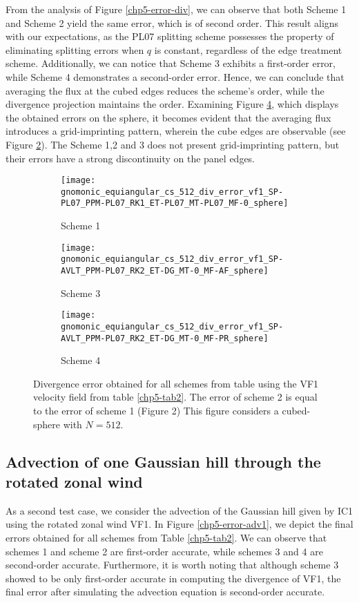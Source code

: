 From the analysis of Figure \ref{chp5-error-div}, we can observe that both Scheme 1 and Scheme 2 yield the same error,
which is of second order. This result aligns with our expectations, as the PL07 splitting scheme possesses the property of eliminating
splitting errors when $q$ is constant, regardless of the edge treatment scheme.
Additionally, we can notice that Scheme 3 exhibits a first-order error, while Scheme 4 demonstrates a second-order error.
Hence, we can conclude that averaging the flux at the cubed edges reduces the scheme's order, while the divergence projection maintains the order.
Examining Figure \ref{chp5-div}, which displays the obtained errors on the sphere, it becomes evident that the averaging
flux introduces a grid-imprinting pattern, wherein the cube edges are observable (see Figure \ref{chp5-div2}).
The Scheme 1,2 and 3 does not present grid-imprinting pattern, but their errors have a strong discontinuity on the panel edges.
\begin{figure}[!htb]
	\centering
	\begin{subfigure}{0.3\textwidth}
		\centering
		\texttt{[image: gnomonic\_equiangular\_cs\_512\_div\_error\_vf1\_SP-PL07\_PPM-PL07\_RK1\_ET-PL07\_MT-PL07\_MF-0\_sphere]}
		\caption{Scheme 1 \label{chp5-div1}}
	\end{subfigure}
	\begin{subfigure}{0.3\textwidth}
	\centering
	\texttt{[image: gnomonic\_equiangular\_cs\_512\_div\_error\_vf1\_SP-AVLT\_PPM-PL07\_RK2\_ET-DG\_MT-0\_MF-AF\_sphere]}
	\caption{Scheme 3 \label{chp5-div2}}
	\end{subfigure}
	\begin{subfigure}{0.3\textwidth}
	\centering
	\texttt{[image: gnomonic\_equiangular\_cs\_512\_div\_error\_vf1\_SP-AVLT\_PPM-PL07\_RK2\_ET-DG\_MT-0\_MF-PR\_sphere]}
	\caption{Scheme 4 \label{chp5-div3}}
	\end{subfigure}
	\caption{ Divergence error obtained for all schemes from table using the VF1 velocity field from table \ref{chp5-tab2}.
		The error of scheme 2 is equal to the error of scheme 1 (Figure 2)
		This figure considers a cubed-sphere with $N=512$. \label{chp5-div}}
\end{figure}

\subsection{Advection of one Gaussian hill through the rotated zonal wind}
As a second test case, we consider the advection of the Gaussian hill given by IC1 using 
the rotated zonal wind VF1.
In Figure \ref{chp5-error-adv1}, we depict the final errors obtained for 
all schemes from Table \ref{chp5-tab2}.
We can observe that schemes 1 and scheme 2 are first-order accurate, while schemes 3 and 4 
are second-order accurate.
Furthermore, it is worth noting that although scheme 3 showed to be only first-order 
accurate in computing the divergence of VF1, the final error after simulating the advection 
equation is second-order accurate.

